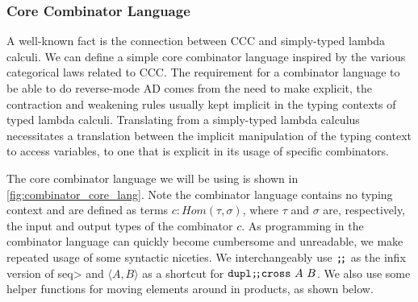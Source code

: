 \subsubsection{Core Combinator Language}\label{sec:combinator-core}
  A well-known fact is the connection between CCC and simply-typed lambda calculi\cite{10.1007/3-540-15198-2_10}.
  We can define a simple core combinator language inspired by the various categorical laws related to CCC.
  The requirement for a combinator language to be able to do reverse-mode AD comes from the need to make explicit, the contraction and weakening rules usually kept implicit in the typing contexts of typed lambda calculi.
  Translating from a simply-typed lambda calculus necessitates a translation between the implicit manipulation of the typing context to access variables, to one that is explicit in its usage of specific combinators.

  The core combinator language we will be using is shown in \cref{fig:combinator_core_lang}.
  Note the combinator language contains no typing context and are defined as terms $c : Hom(\tau, \sigma)$, where $\tau$ and $\sigma$ are, respectively, the input and output types of the combinator $c$.
  As programming in the combinator language can quickly become cumbersome and unreadable, we make repeated usage of some syntactic niceties.
  We interchangeably use $\texttt{;\!;}$ as the infix version of \<seq> and $\langle A, B\rangle$ as a shortcut for $\texttt{dupl} \texttt{;\!;} \texttt{cross}\ A\ B$.
  We also use some helper functions for moving elements around in products, as shown below.

